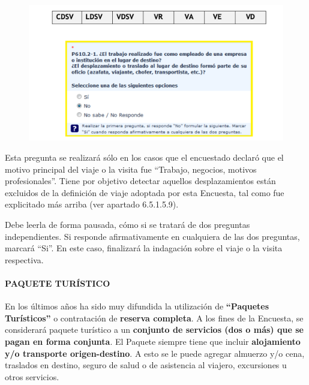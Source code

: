 \documentclass[
  openany]{book}
\begin{document}
\begin{figure}

{\centering \includegraphics[width=1\linewidth]{imagenes/figura6-101} 

}

\end{figure}

Esta pregunta se realizará sólo en los casos que el encuestado declaró que el motivo principal del viaje o la visita fue ``Trabajo, negocios, motivos profesionales''. Tiene por objetivo detectar aquellos desplazamientos están excluidos de la definición de viaje adoptada por esta Encuesta, tal como fue explicitado más arriba (ver apartado 6.5.1.5.9).

Debe leerla de forma pausada, cómo si se tratará de dos preguntas independientes. Si responde afirmativamente en cualquiera de las dos preguntas, marcará ``Si''. En este caso, finalizará la indagación sobre el viaje o la visita respectiva.

\hypertarget{paquete-turuxedstico}{%
\paragraph{\texorpdfstring{\textbf{PAQUETE TURÍSTICO}}{PAQUETE TURÍSTICO}}\label{paquete-turuxedstico}}

En los últimos años ha sido muy difundida la utilización de \textbf{``Paquetes Turísticos''} o contratación de \textbf{reserva completa}. A los fines de la Encuesta, se considerará paquete turístico a un \textbf{conjunto de servicios (dos o más) que se pagan en forma conjunta}. El Paquete siempre tiene que incluir \textbf{alojamiento y/o transporte origen-destino}. A esto se le puede agregar almuerzo y/o cena, traslados en destino, seguro de salud o de asistencia al viajero, excursiones u otros servicios.
\end{document}
